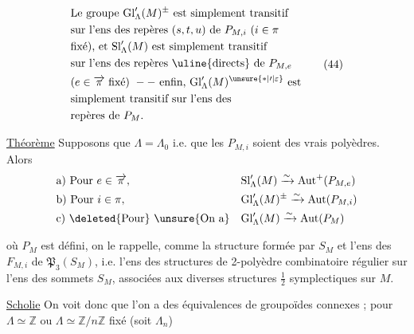 \[
\begin{aligned}
&\text{Le groupe }\mathrm{Gl}'_\Lambda(M)^{\pm}\text{ est simplement transitif}\\
&\text{sur l'ens des repères }(s,t,u)\text{ de }P_{M,i}\ (i\in\pi\\
&\text{fixé), et }\mathrm{Sl}'_\Lambda(M)\text{ est simplement transitif}\\
&\text{sur l'ens des repères \uline{directs} de }P_{M,e}\\
&(e\in\overrightarrow\pi\text{ fixé})\ --\ \text{enfin, }\mathrm{Gl}'_\Lambda(M)^{\unsure{*|\prime|\varepsilon}}\text{ est}\\
&\text{simplement transitif sur l'ens des}\\
&\text{repères de }P_M.
\end{aligned}\tag*{(44)}
\]

\uline{Théorème} Supposons que $\Lambda=\Lambda_0$ i.e. que les
$P_{M,i}$  soient des vrais polyèdres. Alors
\[
\begin{aligned}
&\text{a) Pour } e\in\overrightarrow\pi,\qquad &&\mathrm{Sl}'_\Lambda(M)\xrightarrow{\sim}\operatorname{Aut}^+(P_{M,e})\\
&\text{b) Pour } i\in\pi,&&\mathrm{Gl}'_\Lambda(M)^{\pm}\xrightarrow{\sim}\operatorname{Aut}(P_{M,i})\\
&\text{c) \deleted{Pour} \unsure{On a}}&&\mathrm{Gl}'_\Lambda(M)\xrightarrow{\sim}\operatorname{Aut}(P_M)
\end{aligned}
\]

où $P_M$ est défini, on le rappelle, comme la
structure formée par $S_M$ et l'ens des
$F_{M,i}$ de $\mathfrak P_3(S_M)$, i.e. l'ens des
structures de 2-polyèdre combinatoire régulier
sur l'ens des sommets $S_M$, associées aux
diverses structures $\frac12$ symplectiques sur $M$.

\uline{Scholie} On voit donc que l'on a des
équivalences  de groupoïdes connexes ;
pour $\Lambda\simeq\mathbb Z$ ou $\Lambda\simeq\mathbb Z/n\mathbb Z$ fixé
(soit $\Lambda_n$)
